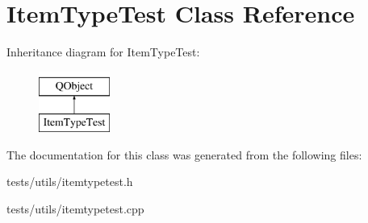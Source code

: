 \hypertarget{classItemTypeTest}{}\section{Item\+Type\+Test Class Reference}
\label{classItemTypeTest}
Inheritance diagram for Item\+Type\+Test\+:\begin{figure}[H]
\begin{center}
\leavevmode
\includegraphics[height=2.000000cm]{d3/de2/classItemTypeTest}
\end{center}
\end{figure}


The documentation for this class was generated from the following files\+:\begin{DoxyCompactItemize}
\item 
tests/utils/itemtypetest.\+h\item 
tests/utils/itemtypetest.\+cpp\end{DoxyCompactItemize}

